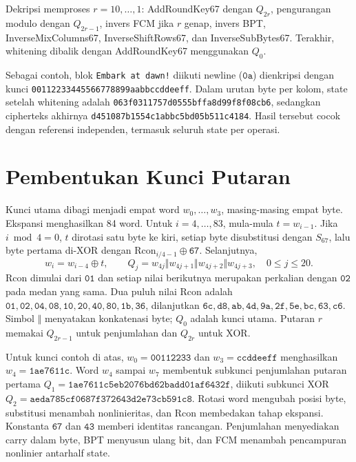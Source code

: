 Dekripsi memproses $r=10,\ldots,1$: AddRoundKey67 dengan $Q_{2r}$,
pengurangan modulo dengan $Q_{2r-1}$, invers FCM jika $r$ genap,
invers BPT, InverseMixColumns67, InverseShiftRows67, dan InverseSubBytes67.
Terakhir, whitening dibalik dengan AddRoundKey67 menggunakan $Q_0$.

Sebagai contoh, blok \texttt{Embark at dawn!} diikuti newline
($\mathtt{0a}$) dienkripsi dengan kunci
\texttt{00112233445566778899aabbccddeeff}. Dalam urutan byte per kolom,
state setelah whitening adalah
\texttt{063f0311757d0555bffa8d99f8f08cb6}, sedangkan cipherteks akhirnya
\texttt{d451087b1554c1abbc5bd05b511c4184}. Hasil tersebut cocok dengan
referensi independen, termasuk seluruh state per operasi.

\section{Pembentukan Kunci Putaran}
Kunci utama dibagi menjadi empat word $w_0,\ldots,w_3$, masing-masing
empat byte. Ekspansi menghasilkan 84 word. Untuk $i=4,\ldots,83$,
mula-mula $t=w_{i-1}$. Jika $i\bmod4=0$, $t$ dirotasi satu byte ke kiri,
setiap byte disubstitusi dengan $S_{67}$, lalu byte pertama di-XOR dengan
$\mathrm{Rcon}_{i/4-1}\oplus\mathtt{67}$. Selanjutnya,
\begin{equation}
  w_i=w_{i-4}\oplus t,\qquad
  Q_j=w_{4j}\Vert w_{4j+1}\Vert w_{4j+2}\Vert w_{4j+3},\quad 0\leq j\leq20.
\end{equation}
Rcon dimulai dari $\mathtt{01}$ dan setiap nilai berikutnya merupakan
perkalian dengan $\mathtt{02}$ pada medan yang sama. Dua puluh nilai Rcon
adalah $\mathtt{01,02,04,08,10,20,40,80,1b,36}$, dilanjutkan
$\mathtt{6c,d8,ab,4d,9a,2f,5e,bc,63,c6}$.
Simbol $\Vert$ menyatakan konkatenasi byte; $Q_0$ adalah kunci utama.
Putaran $r$ memakai $Q_{2r-1}$ untuk penjumlahan dan $Q_{2r}$ untuk XOR.

Untuk kunci contoh di atas, $w_0=\mathtt{00112233}$ dan
$w_3=\mathtt{ccddeeff}$ menghasilkan $w_4=\mathtt{1ae7611c}$.
Word $w_4$ sampai $w_7$ membentuk subkunci penjumlahan putaran pertama
$Q_1=\mathtt{1ae7611c5eb2076bd62badd01af6432f}$, diikuti subkunci XOR
$Q_2=\mathtt{aeda785cf0687f372643d2e73cb591c8}$.
Rotasi word mengubah posisi byte, substitusi menambah nonlinieritas,
dan Rcon membedakan tahap ekspansi. Konstanta $\mathtt{67}$ dan
$\mathtt{43}$ memberi identitas rancangan. Penjumlahan menyediakan carry dalam byte, BPT menyusun
ulang bit, dan FCM menambah pencampuran nonlinier antarhalf state.
